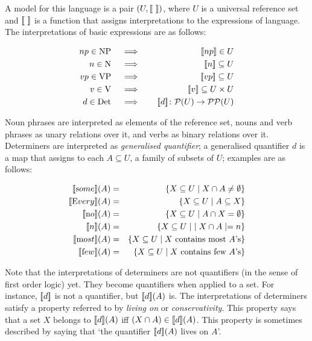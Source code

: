 \noindent
A model for this language is a pair $(U, [\![ \  ]\!])$, where $U$ is a universal reference set and $\semantics{\ }$ is a function that assigns interpretations to the expressions of  language. The  interpretations   of basic expressions  are  as follows:  

\begin{eqnarray*}
np \in \text{NP}  &\quad \implies \quad &  \semantics{np}   \in U   \\
n \in \text{N} &\quad \implies \quad& \semantics{n}  \subseteq U \\
vp \in  \text{VP} &\quad \implies \quad& \semantics{vp}  \subseteq U \\
v \in \text{V} &\quad \implies \quad& \semantics{v} \subseteq U \times U   \\
d \in \text{Det} &\quad \implies \quad& \semantics{d} \colon {\cal P}(U) \to {\cal P}{\cal P}(U)
\end{eqnarray*}


\noindent
Noun phrases are interpreted as elements of the reference set, nouns and verb phrases as unary relations over it, and verbs as binary relations over it.  Determiners are interpreted as \emph{generalised quantifier};  a  generalised quantifier $d$  is a map that  assigns to each $A \subseteq U$, a family of subsets of $U$; examples are as follows:

\begin{eqnarray*}
\semantics{\text some}(A) &=& \{X \subseteq U \mid X \cap A \neq \emptyset\}\\
\semantics{\text Every}(A) &=& \{X \subseteq U \mid A \subseteq X\}\\
\semantics{\text no}(A) &=& \{X \subseteq U \mid  A \cap X = \emptyset\}\\
\semantics{n}(A) &=& \{X \subseteq U \mid \ \mid X \cap A \mid = n\}\\
\semantics{\text most}(A) &=& \{X \subseteq U \mid X \  \mbox{contains most} \ A\text{'s}\}\\
\semantics{\text few}(A) &=& \{X \subseteq U \mid  X \  \mbox{contains few} \ A\text{'s}\}
\end{eqnarray*}
 

Note that the interpretations of determiners are not quantifiers (in the sense of first order logic) yet. They become quantifiers when applied to a set. For instance, $[\![ d ]\!]$ is not a quantifier, but $[\![ d ]\!](A)$ is. The interpretations of determiners satisfy a property referred to by \emph{living on} or \emph{conservativity}. This property says that a set $X$ belongs to  $[\![ d ]\!](A)$ iff  $(X \cap A) \in [\![ d ]\!](A)$. This property is sometimes described by saying that `the quantifier $[\![ d ]\!](A)$ lives on $A$'. 

